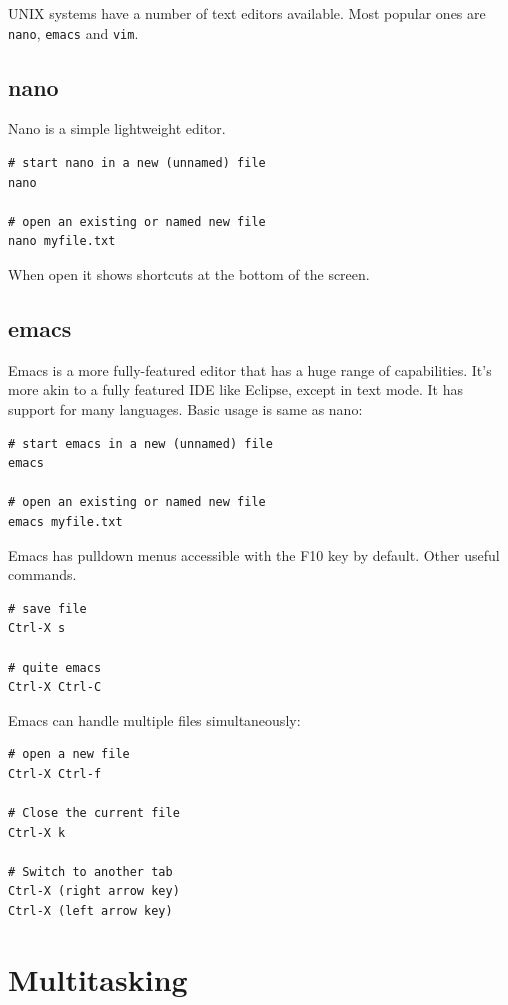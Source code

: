 \documentclass{pgnotes}
\begin{document}
UNIX systems have a number of text editors available.
Most popular ones are \texttt{nano}, \texttt{emacs} and \texttt{vim}.

\subsection{nano}

Nano is a simple lightweight editor.

\begin{verbatim}
# start nano in a new (unnamed) file
nano

# open an existing or named new file
nano myfile.txt
\end{verbatim}

When open it shows shortcuts at the bottom of the screen.

\subsection{emacs}

Emacs is a more fully-featured editor that has a huge range of capabilities.
It's more akin to a fully featured IDE like Eclipse, except in text mode.
It has support for many languages.
Basic usage is same as nano:

\begin{verbatim}
# start emacs in a new (unnamed) file
emacs

# open an existing or named new file
emacs myfile.txt
\end{verbatim}

Emacs has pulldown menus accessible with the F10 key by default.
Other useful commands.

\begin{verbatim}
# save file
Ctrl-X s

# quite emacs
Ctrl-X Ctrl-C
\end{verbatim}

Emacs can handle multiple files simultaneously:

\begin{verbatim}
# open a new file
Ctrl-X Ctrl-f

# Close the current file
Ctrl-X k

# Switch to another tab
Ctrl-X (right arrow key)
Ctrl-X (left arrow key)
\end{verbatim}

\section{Multitasking}
\end{document}
